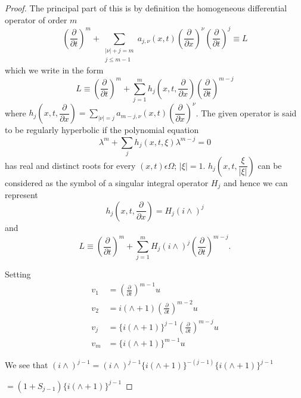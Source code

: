\begin{proof}
The principal part of this is by definition the homogeneous
differential operator of order $m$ 
\begin{equation}
\left(\frac{\partial}{\partial t}\right)^m + \sum_{\substack{|\nu | +j= m\\ j\leq
      m-1}} a_{j,\nu}(x,t)\left(\frac{\partial}{ \partial x}\right)^\nu
  \left(\frac{\partial}{ \partial t}\right)^j  \equiv L
  \tag{6.13} \label{chap3-eq6.13} 
\end{equation}
which we write in the form
$$
L \equiv \left(\frac{\partial}{\partial t}\right)^m + \sum \limits^m_{j=1} h_j
\left(x, t,  \frac{\partial}{\partial x}\right)\left(\frac{\partial}{\partial
  t}\right)^{m-j} 
$$
where $h_j \left(x, t, \dfrac{\partial}{\partial x}\right) = \sum\limits_{| \nu
  | = j} a_{m-j, \nu} (x, t) \left(\dfrac{\partial}{\partial x}\right)^\nu$. The
given operator is said to be regularly hyperbolic if the polynomial
equation 
\begin{equation}
\lambda^m + \sum_{j} h_j (x, t,\xi) \lambda^{m-j} = 0
\tag{6.14}\label{chap3-eq6.14} 
\end{equation}
has real and distinct roots for every $(x, t) \epsilon \Omega$; $| \xi
| =1$. $h_j \left(x, t, \dfrac{ \xi}{| \xi |}\right)$  can be\pageoriginale
considered as the symbol of a singular integral operator $H_j$ and
hence we can represent  
$$
h_j \left(x, t, \frac{ \partial}{ \partial x}\right) = H_j (i \wedge)^j 
$$
and
\begin{equation}
L \equiv \left(\frac{\partial}{\partial t}\right)^m + \sum\limits^m_{j=1} H_j (i
\wedge )^j \left(\frac{\partial}{\partial
  t}\right)^{m-j}. \tag{6.15} \label{chap3-eq6.15} 
\end{equation}

Setting
\begin{align*}
v_1 & = \left(\frac{\partial}{ \partial t}\right)^{m-1} u\\
v_2 & = i(\wedge + 1)\left(\frac{\partial}{\partial t}\right)^{m-2} u\\
v_j & = \{ i (\wedge + 1 ) \}^{j-1}\left(\frac{\partial}{\partial t}\right)^{m-j}
u\\ 
v_m & = \{ i (\wedge + 1) \}^{m-1} u
\end{align*}

We see that  \; $(i \wedge)^{j-1} = (i \wedge )^{j-1}\{ i 
(\wedge + 1) \}^{-(j-1)} \{ i (\wedge + 1) \}^{j-1}$

\hspace{2.6cm} $ = (1 + S_{j-1})\{ i(\wedge + 1) \}^{j-1}$


\end{proof}
